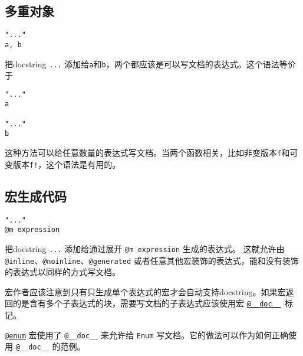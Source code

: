 \hypertarget{6306013858572164490}{}


\subsection{多重对象}




\begin{verbatim}
"..."
a, b
\end{verbatim}



把docstring \texttt{{\textquotedbl}...{\textquotedbl}} 添加给\texttt{a}和\texttt{b}，两个都应该是可以写文档的表达式。这个语法等价于




\begin{verbatim}
"..."
a

"..."
b
\end{verbatim}



这种方法可以给任意数量的表达式写文档。当两个函数相关，比如非变版本\texttt{f}和可变版本\texttt{f!}，这个语法是有用的。



\hypertarget{5068022185116881179}{}


\subsection{宏生成代码}




\begin{verbatim}
"..."
@m expression
\end{verbatim}



把docstring \texttt{{\textquotedbl}...{\textquotedbl}} 添加给通过展开 \texttt{@m expression} 生成的表达式。 这就允许由 \texttt{@inline}、\texttt{@noinline}、\texttt{@generated} 或者任意其他宏装饰的表达式，能和没有装饰的表达式以同样的方式写文档。



宏作者应该注意到只有只生成单个表达式的宏才会自动支持docstring。如果宏返回的是含有多个子表达式的块，需要写文档的子表达式应该使用宏 \hyperlink{8194145670752069829}{\texttt{@\_\_doc\_\_}} 标记。



\hyperlink{18177775477210803027}{\texttt{@enum}} 宏使用了 \texttt{@\_\_doc\_\_} 来允许给 \texttt{Enum} 写文档。它的做法可以作为如何正确使用 \texttt{@\_\_doc\_\_} 的范例。


